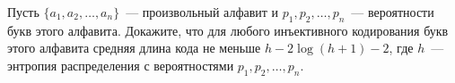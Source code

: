 Пусть $\{a_1, a_2, \dots, a_n\}$~--- произвольный алфавит и $p_1, p_2, \dots, p_n$~--- вероятности букв
этого алфавита. Докажите, что для любого инъективного кодирования букв этого алфавита средняя длина кода 
не меньше $h - 2 \log (h + 1) - 2$, где $h$~--- энтропия распределения с вероятностями $p_1, p_2, \dots, p_n$.
